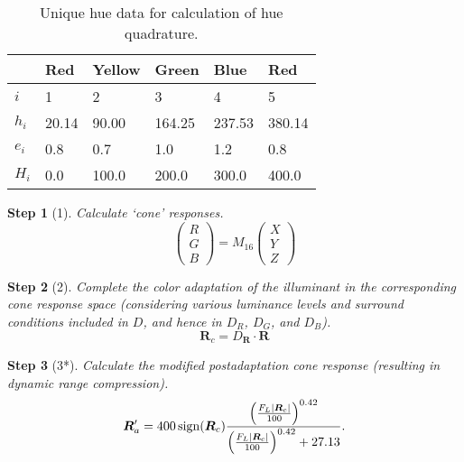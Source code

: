 \documentclass[twocolumn]{scrartcl}
\theoremstyle{named}
\newtheorem*{step}{Step}
\DeclarePairedDelimiter\abs{\lvert}{\rvert}%
\DeclareMathOperator{\sign}{sign}
\newcommand\rgb{\bm{R}}
\begin{document}
\begin{table}\centering
  \begin{tabularx}{\linewidth}{XXXXXX}
  \toprule
        & Red   & Yellow & Green & Blue   & Red\\
  \midrule
  $i$   & 1     & 2     & 3      & 4      & 5\\
  $h_i$ & 20.14 & 90.00 & 164.25 & 237.53 & 380.14\\
  $e_i$ & 0.8   & 0.7   & 1.0    & 1.2    & 0.8\\
  $H_i$ & 0.0   & 100.0 & 200.0  & 300.0  & 400.0\\
  \bottomrule
\end{tabularx}
  \caption{Unique hue data for calculation of hue quadrature.}\label{table:hue}
\end{table}

\begin{step}[1]
Calculate `cone' responses.
\[
\begin{pmatrix}R\\G\\B\end{pmatrix}
= M_{16} \begin{pmatrix}X\\Y\\Z\end{pmatrix}
\]
\end{step}

\begin{step}[2]
Complete the color adaptation of the illuminant in
the corresponding cone response space (considering various
luminance levels and surround conditions included in $D$, and
hence in $D_R$, $D_G$, and $D_B$).
\[
  \rgb_c = D_{\rgb} \cdot \rgb
\]
\end{step}

\begin{step}[3*]
Calculate the modified postadaptation cone response
(resulting in dynamic range compression).
\[
  \rgb'_a = 400 \sign(\rgb_c)
    \frac
    {{\left(\frac{F_L \abs{\rgb_c}}{100}\right)}^{0.42}}
    {{\left(\frac{F_L \abs{\rgb_c}}{100}\right)}^{0.42} + 27.13}.
\]
\end{step}
\end{document}
